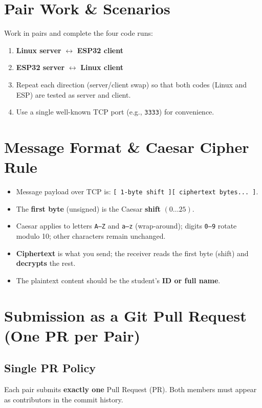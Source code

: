 \documentclass[11pt]{article}
\begin{document}
\section*{Pair Work \& Scenarios}
Work in pairs and complete the four code runs:
\begin{enumerate}
  \item \textbf{Linux server} \(\leftrightarrow\) \textbf{ESP32 client}
  \item \textbf{ESP32 server} \(\leftrightarrow\) \textbf{Linux client}
  \item Repeat each direction (server/client swap) so that both codes (Linux and ESP) are tested as server and client.
  \item Use a single well-known TCP port (e.g., \texttt{3333}) for convenience.
\end{enumerate}

\section*{Message Format \& Caesar Cipher Rule}
\begin{itemize}
  \item Message payload over TCP is: \texttt{[ 1-byte shift ][ ciphertext bytes... ]}.
  \item The \textbf{first byte} (unsigned) is the Caesar \textbf{shift} \((0\ldots 25)\).
  \item Caesar applies to letters \texttt{A--Z} and \texttt{a--z} (wrap-around); digits \texttt{0--9} rotate modulo 10; other characters remain unchanged.
  \item \textbf{Ciphertext} is what you send; the receiver reads the first byte (shift) and \textbf{decrypts} the rest.
  \item The plaintext content should be the student's \textbf{ID or full name}.
\end{itemize}


\section*{Submission as a Git Pull Request (One PR per Pair)}

\subsection*{Single PR Policy}
Each pair submits \textbf{exactly one} Pull Request (PR). Both members must appear as contributors in the commit history.
\end{document}
